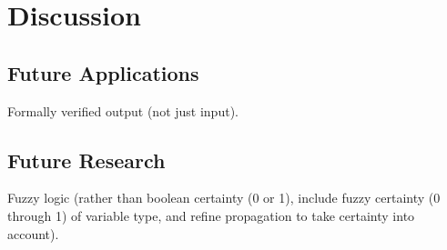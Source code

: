 
\section{Discussion}



\subsection{Future Applications}


Formally verified output (not just input).


\subsection{Future Research}


Fuzzy logic (rather than boolean certainty (0 or 1), include fuzzy certainty (0 through 1) of variable type, and refine propagation to take certainty into account).
